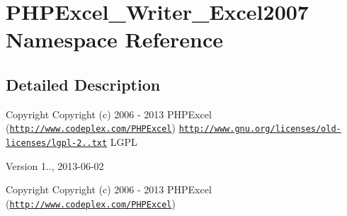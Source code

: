 \hypertarget{namespacePHPExcel__Writer__Excel2007}{}\section{P\+H\+P\+Excel\+\_\+\+Writer\+\_\+\+Excel2007 Namespace Reference}
\label{namespacePHPExcel__Writer__Excel2007}


\subsection{Detailed Description}
\begin{DoxyCopyright}{Copyright}
Copyright (c) 2006 -\/ 2013 P\+H\+P\+Excel (\href{http://www.codeplex.com/PHPExcel}{\tt http\+://www.\+codeplex.\+com/\+P\+H\+P\+Excel})  \href{http://www.gnu.org/licenses/old-licenses/lgpl-2.1.txt}{\tt http\+://www.\+gnu.\+org/licenses/old-\/licenses/lgpl-\/2..\+txt} L\+G\+PL 
\end{DoxyCopyright}
\begin{DoxyVersion}{Version}
1.., 2013-\/06-\/02
\end{DoxyVersion}
\begin{DoxyCopyright}{Copyright}
Copyright (c) 2006 -\/ 2013 P\+H\+P\+Excel (\href{http://www.codeplex.com/PHPExcel}{\tt http\+://www.\+codeplex.\+com/\+P\+H\+P\+Excel}) 
\end{DoxyCopyright}
